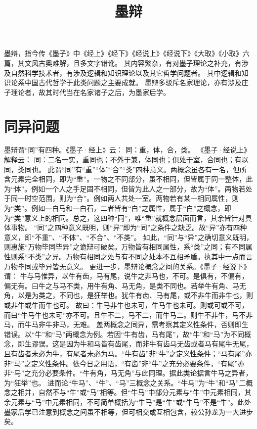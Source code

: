 \documentclass[11pt]{article}
\title{墨辩}
\date{}
\begin{document}
  \maketitle
  
  \newpage
  \linenumbers

墨辩，指今传《墨子》中《经上》《经下》《经说上》《经说下》《大取》《小取》六篇，其文风古奥难解，且多文字错讹。
其内容繁杂，有对墨子理论之补充，有涉及自然科学技术者，有涉及逻辑和知识理论以及其它哲学问题者。
其中逻辑和知识论系中国古代哲学于此类问题之主要成就。
\newline
墨辩多驳斥名家理论，亦有涉及庄子理论者，故其时代当在名家诸子之后，为墨家后学。

\section{同异问题}
墨辩谓“同”有四种。《墨子·经上》云：
同：重，体，合，类。
《墨子·经说上》解释云：
同：二名一实，重同也；不外于兼，体同也；俱处于室，合同也；有以同，类同也。
此谓“同”有“重”“体”“合”“类”四种意义。两概念虽各有一名，但所含元素完全相同，即为“重”。一物之不同部分，虽不相同，但皆属于同一整体，此为“体”。例如一个人之手足固不相同，但皆为此人之一部分，故为“体”。两物若处于同一时空范围，则为“合”。例如两人共处一室。两物若有某一相同属性，则为“类”。例如一白马和一白石，二者皆有“白”之属性，属于“白”之概念，即为“类”意义上的相同。总之，这四种“同”，唯“重”就概念层面而言，其余皆针对具体事物。
“同”之四种意义既明，则“异”即为“同”之条件之缺乏。故“异”亦有四种意义，即“不重”、“不体”、“不合”、“不类”。
如此，“同”与“异”之确切意义既明，则惠施“万物毕同毕异”之诡辩可破矣。万物皆有相同属性，系“类”之同；有不同属性则系“不类”之异。万物有相同之处与有不同之处本不互相矛盾。执其中一点而言万物毕同或毕异皆无意义。
更进一步，墨辩论概念之间的关系。《墨子·经说下》谓：
牛与马惟异，以牛有齿，马有尾，说牛之非马也，不可。是俱有，不偏有，偏无有。曰牛之与马不类，用牛有角、马无角，是类不同也。若举牛有角、马无角，以是为类之，不同也，是狂举也。犹牛有齿、马有尾，或不非牛而非牛也，则或非牛或牛而牛也可。
故曰：牛马非牛也未可，牛马牛也未可。则或可或不可，而曰“牛马牛也未可”亦不可。且牛不二，马不二，而牛马二。则牛不非牛，马不非马，而牛马非牛非马，无难。
盖两概念之同异，需考察其定义性条件，否则即生错误。以“牛”和“马”两概念为例。若因“牛有齿，马有尾”，故“牛”和“马”为不同概念，即生谬误。这是因为牛和马皆有齿尾，而非牛有齿马无齿或者马有尾牛无尾，且有齿者未必为牛，有尾者未必为马。“牛有齿”非“牛”之定义性条件；“马有尾”亦非“马”之定义性条件。依今日之用语，“有齿”非“牛”之充分必要条件，“有尾”亦非“马”之充分必要条件。“牛有角，马无角”与此同理。据此类论据言牛马之异者，为“狂举”也。
    进而论“牛马”、“牛”、“马”三概念之关系。“牛马”为“牛”和“马”二概念之相并，自然不与“牛”或“马”相等。但“牛马”中部分元素与“牛”中元素相同，其余元素与“马”中元素相同，不可简单概括为“牛马”是“牛”或“牛马”不是“牛”。此处墨家后学已注意到概念之间虽不相等，但可相交或互相包含，较公孙龙为一大进步矣。
\end{document}
